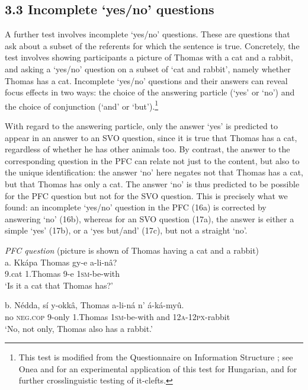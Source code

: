 \documentclass[output=paper]{langsci/langscibook}
\begin{document}
\subsection{3.3 Incomplete ‘yes/no’ questions}

A further test involves incomplete ‘yes/no’ questions. These are questions that ask about a subset of the referents for which the sentence is true. Concretely, the test involves showing participants a picture of Thomas with a cat and a rabbit, and asking a ‘yes/no’ question on a subset of ‘cat and rabbit’, namely whether Thomas has a cat. Incomplete ‘yes/no’ questions and their answers can reveal focus effects in two ways: the choice of the answering particle (‘yes’ or ‘no’) and the choice of conjunction (‘and’ or ‘but’).\footnote{ This test is modified from the Questionnaire on Information Structure \citep{SkopeteasEtAl2006}; see Onea and \citet{Beaver2011} for an experimental application of this test for Hungarian, and \citet{DestruelEtAl2014} for further crosslinguistic testing of it-clefts.}

  With regard to the answering particle, only the answer ‘yes’ is predicted to appear in an answer to an SVO question, since it is true that Thomas has a cat, regardless of whether he has other animals too. By contrast, the answer to the corresponding question in the PFC can relate not just to the content, but also to the unique identification: the answer ‘no’ here negates not that Thomas has a cat, but that Thomas has only a cat. The answer ‘no’ is thus predicted to be possible for the PFC question but not for the SVO question. This is precisely what we found: an incomplete ‘yes/no’ question in the PFC (16a) is corrected by answering ‘no’ (16b), whereas for an SVO question (17a), the answer is either a simple ‘yes’ (17b), or a ‘yes but/and’ (17c), but not a straight ‘no’. 

\ea
{\textit{PFC question}}
       (picture is shown of Thomas having a cat and a rabbit)\\
\gll   a.  Kkápa  Thomas  gy-e  a-li-nâ?\\
         9.cat  1.Thomas  9-e  \textsc{1sm}{}-be-with\\
\glt     ‘Is it a cat that Thomas has?’
\z

\ea
\gll   b.  Nédda,  sí    y-okkâ,  Thomas  a-li-ná    n’  á-ká-myû.\\
         no  \textsc{neg}.\textsc{cop}  9-only  1.Thomas  \textsc{1sm}{}-be-with  and  \textsc{12a}{}-\textsc{12px}{}-rabbit\\
\glt     ‘No, not only, Thomas also has a rabbit.’
\z
\end{document}

